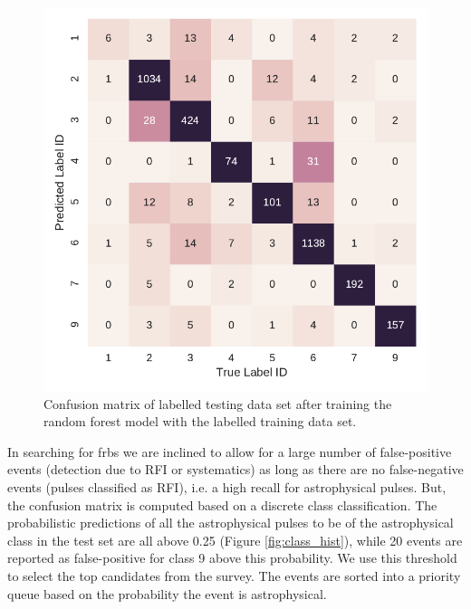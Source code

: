 \documentclass[a4paper,fleqn,usenatbib]{mnras}
\begin{document}
\begin{figure}
    \includegraphics[width=1.0\linewidth]{figures/confusion_matrix.pdf}
    \caption{Confusion matrix of labelled testing data set after training the
    random forest model with the labelled training data set.
    }
    \label{fig:confuse}
\end{figure}

In searching for \glspl{frb} we are inclined to allow for a large number
of false-positive events (detection due to RFI or systematics) as long as there
are no false-negative events (pulses classified as RFI), i.e. a high recall for
astrophysical pulses. But, the confusion matrix is computed based on a discrete
class classification. The probabilistic predictions of all the astrophysical
pulses to be of the astrophysical class in the test set are all above 0.25
(Figure \ref{fig:class_hist}), while 20 events are reported as
false-positive for class 9 above this probability. We use this threshold to
select the top candidates from the survey. The events are sorted into a priority
queue based on the probability the event is astrophysical.
\end{document}
